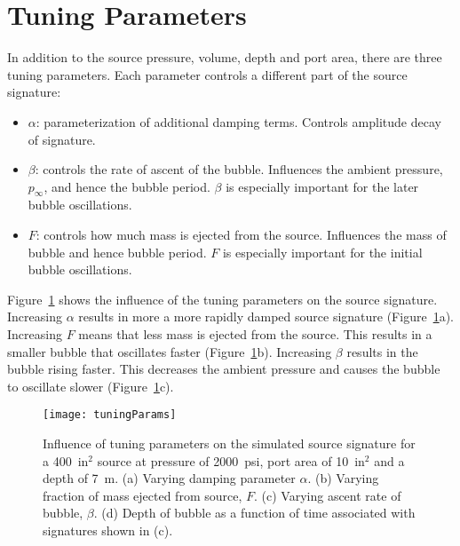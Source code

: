 \documentclass[10pt]{article}
\begin{document}
\newpage
\section{Tuning Parameters}
In addition to the source pressure, volume, depth and port area, there are three tuning parameters. Each parameter controls a different part of the source signature:
\begin{itemize}
\item $\alpha$: parameterization of additional damping terms. Controls amplitude decay of signature.
\item $\beta$: controls the rate of ascent of the bubble. Influences the ambient pressure, $p_\infty$, and hence the bubble period. $\beta$ is especially important for the later bubble oscillations. 
\item $F$: controls how much mass is ejected from the source. Influences the mass of bubble and hence bubble period. $F$ is especially important for the initial bubble oscillations. 
\end{itemize}
Figure~\ref{fig:tuning parameters} shows the influence of the tuning parameters on the source signature. Increasing $\alpha$ results in more a more rapidly damped source signature (Figure~\ref{fig:tuning parameters}a). Increasing $F$ means that less mass is ejected from the source. This results in a smaller bubble that oscillates faster (Figure~\ref{fig:tuning parameters}b). Increasing $\beta$ results in the bubble rising faster. This decreases the ambient pressure and causes the bubble to oscillate slower (Figure~\ref{fig:tuning parameters}c).

\begin{figure}[h!]
\centering
\texttt{[image: tuningParams]}
\caption{Influence of tuning parameters on the simulated source signature for a 400~in$^2$ source at pressure of 2000~psi, port area of 10~in$^2$ and a depth of 7~m. (a) Varying damping parameter $\alpha$. (b) Varying fraction of mass ejected from source, $F$. (c) Varying ascent rate of bubble, $\beta$. (d) Depth of bubble as a function of time associated with signatures shown in (c).}
\label{fig:tuning parameters}
\end{figure}

\newpage
\end{document}
